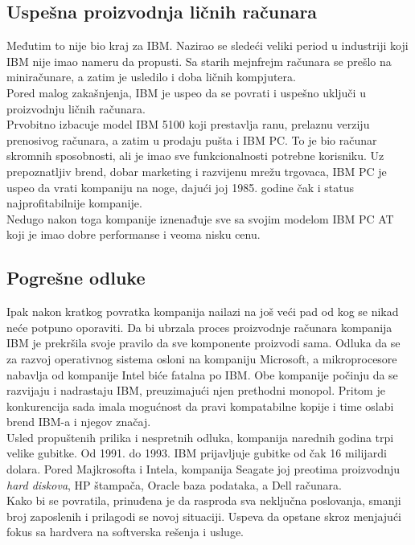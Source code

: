 \documentclass[a4paper]{article}
\begin{document}
\subsection{Uspešna proizvodnja ličnih računara}
Međutim to nije bio kraj za IBM. Nazirao se sledeći veliki period u industriji koji IBM nije imao nameru da propusti. Sa starih mejnfrejm računara se prešlo na miniračunare, a zatim je usledilo i doba ličnih kompjutera. \\Pored malog zakašnjenja, IBM je uspeo da se povrati i uspešno uključi u proizvodnju ličnih računara.\\ Prvobitno izbacuje model IBM 5100 koji prestavlja ranu, prelaznu verziju prenosivog računara, a zatim u prodaju pušta i IBM PC. To je bio računar skromnih sposobnosti, ali je imao sve funkcionalnosti potrebne korisniku. Uz prepoznatljiv brend, dobar marketing i razvijenu mrežu trgovaca, IBM PC je uspeo da vrati kompaniju na noge, dajući joj 1985. godine čak i status najprofitabilnije kompanije.%
 \\Nedugo nakon toga kompanije iznenađuje sve sa svojim modelom IBM PC AT koji je imao dobre performanse i veoma nisku cenu. 
\subsection{Pogrešne odluke}
Ipak nakon kratkog povratka kompanija nailazi na još veći pad od kog se nikad neće potpuno oporaviti. %
Da bi ubrzala proces proizvodnje računara kompanija IBM je prekršila svoje pravilo da sve komponente proizvodi sama. Odluka da se za razvoj operativnog sistema osloni na kompaniju Microsoft, a mikroprocesore nabavlja od kompanije Intel biće fatalna po IBM. Obe kompanije počinju da se razvijaju i nadrastaju IBM, preuzimajući njen prethodni monopol. Pritom je konkurencija sada imala mogućnost da pravi kompatabilne kopije i time oslabi brend IBM-a i njegov značaj.  \\
Usled propuštenih prilika i nespretnih odluka, kompanija narednih godina trpi velike gubitke. Od 1991. do 1993. IBM prijavljuje gubitke od čak 16 milijardi dolara. Pored Majkrosofta i Intela, kompanija Seagate joj preotima proizvodnju \emph{hard diskova}, HP štampača, Oracle baza podataka, a Dell računara. \\ 
Kako bi se povratila, prinuđena je da rasproda sva neključna poslovanja, smanji broj zaposlenih i prilagodi se novoj situaciji. Uspeva da opstane skroz menjajući fokus sa hardvera na softverska rešenja i usluge.
\end{document}

